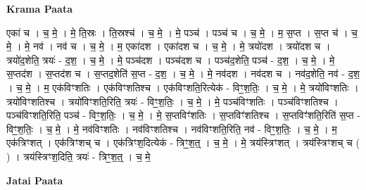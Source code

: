 \documentclass[17pt]{extarticle}
\begin{document}
\textbf{Krama Paata} \newline

एका॑ च । च॒ मे॒ । मे॒ ति॒स्रः । ति॒स्रश्च॑ । च॒ मे॒ । मे॒ पञ्च॑ । पञ्च॑ च । च॒ मे॒ । म॒ स॒प्त । स॒प्त च॑ । च॒ मे॒ । मे॒ नव॑ । नव॑ च । च॒ मे॒ । म॒ एका॑दश । एका॑दश च । च॒ मे॒ । मे॒ त्रयो॑दश । त्रयो॑दश च । त्रयो॑द॒शेति॒ त्रयः॑ - द॒श॒ । च॒ मे॒ । मे॒ पञ्च॑दश । पञ्च॑दश च । पञ्च॑द॒शेति॒ पञ्च॑ - द॒श॒ । च॒ मे॒ । मे॒ स॒प्तद॑श । स॒प्तद॑श च । स॒प्तद॒शेति॑ स॒प्त - द॒श॒ । च॒ मे॒ । मे॒ नव॑दश । नव॑दश च । नव॑द॒शेति॒ नव॑ - द॒श॒ । च॒ मे॒ । म॒ एक॑विꣳशतिः । एक॑विꣳशतिश्च । एक॑विꣳशति॒रित्येक॑ - विꣳ॒॒श॒तिः॒ । च॒ मे॒ । मे॒ त्रयो॑विꣳशतिः । त्रयो॑विꣳशतिश्च । त्रयो॑विꣳशति॒रिति॒ त्रयः॑ - विꣳ॒॒श॒तिः॒ । च॒ मे॒ । मे॒ पञ्च॑विꣳशतिः । पञ्च॑विꣳशतिश्च । पञ्च॑विꣳशति॒रिति॒ पञ्च॑ - विꣳ॒॒श॒तिः॒ । च॒ मे॒ । मे॒ स॒प्तविꣳ॑शतिः । स॒प्तविꣳ॑शतिश्च । स॒प्तविꣳ॑शति॒रिति॑ स॒प्त - विꣳ॒॒श॒तिः॒ । च॒ मे॒ । मे॒ नव॑विꣳशतिः । नव॑विꣳशतिश्च । नव॑विꣳशति॒रिति॒ नव॑ - विꣳ॒॒श॒तिः॒ । च॒ मे॒ । म॒ एक॑त्रिꣳशत् । एक॑त्रिꣳशच् च । एक॑त्रिꣳश॒दित्येक॑ - त्रिꣳ॒॒श॒त्॒ । च॒ मे॒ । मे॒ त्रय॑स्त्रिꣳशत् । त्रय॑स्त्रिꣳशच् च ( ) । त्रय॑स्त्रिꣳश॒दिति॒ त्रयः॑ - त्रिꣳ॒॒श॒त्॒ । च॒ मे॒ \newline

\textbf{Jatai Paata} \newline
\end{document}
